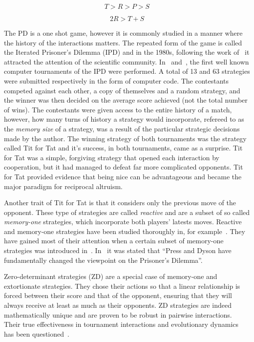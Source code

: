 \documentclass[10pt]{article}
\begin{document}
\begin{equation}\label{eq:pd_constrain_one}
    T > R > P > S
\end{equation}

\begin{equation}\label{eq:pd_constrain_two}
    2R > T + S
\end{equation}

The PD is a one shot game, however it is commonly studied in a manner where the
history of the interactions matters. The repeated form of the game is called the
Iterated Prisoner's Dilemma (IPD) and in the 1980s, following the work
of~\cite{Axelrod1980a, Axelrod1980b} it attracted the attention of the
scientific community. In~\cite{Axelrod1980a} and~\cite{Axelrod1980b}, the first
well known computer tournaments of the IPD were performed. A total of 13 and 63
strategies were submitted respectively in the form of computer code. The
contestants competed against each other, a copy of themselves and a random
strategy, and the winner was then decided on the average score achieved (not the
total number of wins). The contestants were given access to the entire history
of a match, however, how many turns of history a strategy would incorporate,
refereed to as the \textit{memory size} of a strategy, was a result of the
particular strategic decisions made by the author. The winning strategy of both
tournaments was the strategy called Tit for Tat and it's success, in both
tournaments, came as a surprise. Tit for Tat was a simple, forgiving strategy
that opened each interaction by cooperation, but it had managed to defeat far
more complicated opponents. Tit for Tat provided evidence that being nice can be
advantageous and became the major paradigm for reciprocal altruism.

Another trait of Tit for Tat is that it considers only the previous move of the
opponent. These type of strategies are called \textit{reactive} \cite{Nowak1989}
and are a subset of so called \textit{memory-one} strategies, which incorporate
both players' latests moves. Reactive and memory-one strategies have been
studied thoroughly in, for example~\cite{Nowak1990, Nowak1993}. They have gained
most of their attention when a certain subset of memory-one strategies was
introduced in~\cite{Press2012}. In~\cite{Stewart2012} it was stated that ``Press
and Dyson have fundamentally changed the viewpoint on the Prisoner's Dilemma''.

Zero-determinant strategies (ZD) are a special case of memory-one and
extortionate strategies. They chose their actions so that a linear relationship
is forced between their score and that of the opponent, ensuring that they will
always receive at least as much as their opponents. ZD strategies are indeed
mathematically unique and are proven to be robust in pairwise interactions.
Their true effectiveness in tournament interactions and evolutionary
dynamics has been questioned~\cite{adami2013, Knight2018, Harper2015}.
\end{document}
